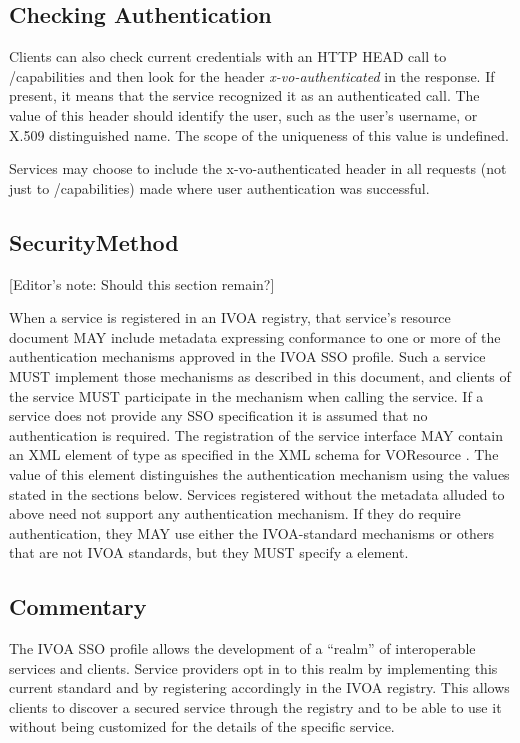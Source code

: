 \documentclass[11pt,a4paper]{ivoa}
\begin{document}
\subsection{Checking Authentication}

Clients can also check current credentials with an HTTP HEAD call to
/capabilities and then look for the header \emph{x-vo-authenticated} in
the response. If present, it means that the service recognized it as an
authenticated call.  The value of this header should identify the user,
such as the user's username, or X.509 distinguished name.  The scope of
the uniqueness of this value is undefined.

Services may choose to include the x-vo-authenticated header in all
requests (not just to /capabilities) made where user authentication was
successful.

\subsection{SecurityMethod}

[Editor's note: Should this section remain?]

When a service is registered in an IVOA registry, that service's
resource document MAY include metadata expressing conformance to one or
more of the authentication mechanisms approved in the IVOA SSO profile.
Such a service MUST implement those mechanisms as described in this
document, and clients of the service MUST participate in the mechanism
when calling the service. If a service does not provide any SSO
specification it is assumed that no authentication is required.
The registration of the service interface MAY contain an XML element
of type  as specified in the XML schema for
VOResource \citep{2018ivoa.spec.0625P}. The value of this element
distinguishes the authentication mechanism using the values stated in
the sections below. Services registered without the metadata alluded to
above need not support any authentication mechanism. If they do require
authentication, they MAY use either the IVOA-standard mechanisms or
others that are not IVOA standards, but they MUST specify a
 element.

\subsection{Commentary}
The IVOA SSO profile allows the development of a ``realm'' of
interoperable services and clients.
Service providers opt in to this realm by implementing this current
standard and by registering accordingly in the IVOA registry.
This allows clients to discover a secured service through the registry
and to be able to use it without
being customized for the details of the specific service.
\end{document}
